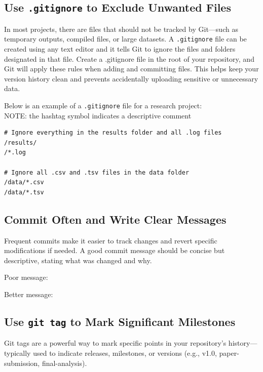\subsection*{Use \texttt{.gitignore} to Exclude Unwanted Files}
In most projects, there are files that should not be tracked by Git—such as temporary outputs, compiled files, or large datasets. A \texttt{.gitignore} file can be created using any text editor and it tells Git to ignore the files and folders designated in that file. Create a .gitignore file in the root of your repository, and Git will apply these rules when adding and committing files. This helps keep your version history clean and prevents accidentally uploading sensitive or unnecessary data.

\noindent Below is an example of a \texttt{.gitignore} file for a research project:\\
{\footnotesize NOTE: the hashtag symbol indicates a descriptive comment}

\begin{verbatim}
# Ignore everything in the results folder and all .log files
/results/
/*.log

# Ignore all .csv and .tsv files in the data folder
/data/*.csv
/data/*.tsv
\end{verbatim}

\subsection*{Commit Often and Write Clear Messages}
Frequent commits make it easier to track changes and revert specific modifications if needed. A good commit message should be concise but descriptive, stating what was changed and why.

\noindent Poor message:
\begin{terminal}
\end{terminal}
\noindent Better message:
\begin{terminal}
\end{terminal}

\subsection*{Use \texttt{git tag} to Mark Significant Milestones}
Git tags are a powerful way to mark specific points in your repository's history—typically used to indicate releases, milestones, or versions (e.g., v1.0, paper-submission, final-analysis).

